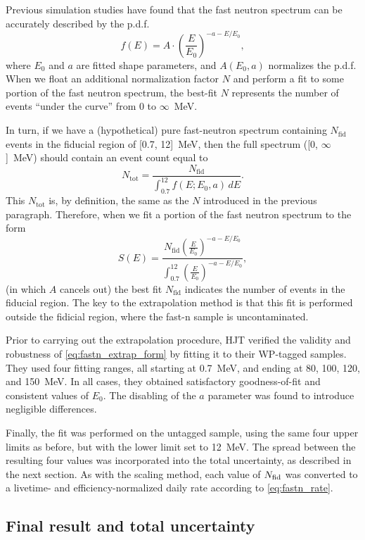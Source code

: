 \documentclass[../thesis.tex]{subfiles}
\begin{document}
Previous simulation studies have found that the fast neutron spectrum can be
accurately described by the p.d.f.
\[ f(E) = A \cdot \left( \frac{E}{E_0} \right)^{-a-E/E_0}, \] where $E_0$ and
$a$ are fitted shape parameters, and $A(E_0, a)$ normalizes the p.d.f. When we
float an additional normalization factor $N$ and perform a fit to some portion
of the fast neutron spectrum, the best-fit $N$ represents the number of events
``under the curve'' from 0 to $\infty$~MeV.

In turn, if we have a (hypothetical) pure fast-neutron spectrum containing
$N_\mathrm{fid}$ events in the fiducial region of [0.7, 12]~MeV, then the full
spectrum ([0, $\infty$]~MeV) should contain an event count equal to
\[ N_\mathrm{tot} = \frac{N_\mathrm{fid}}{\int_{0.7}^{12} f(E; E_0, a)\,dE }. \]
This $N_\mathrm{tot}$ is, by definition, the same as the $N$ introduced in the
previous paragraph. Therefore, when we fit a portion of the fast neutron
spectrum to the form
\begin{equation}
  \label{eq:fastn_extrap_form}
  S(E) = \frac{N_\mathrm{fid} \left( \frac{E}{E_0} \right)^{-a-E/E_0}}
  {\int_{0.7}^{12} \left( \frac{E}{E_0} \right)^{-a-E/E_0} },
\end{equation}
(in which $A$ cancels out) the best fit $N_\mathrm{fid}$ indicates the number of
events in the fiducial region. The key to the extrapolation method is that this
fit is performed outside the fidicial region, where the fast-n sample is
uncontaminated.

Prior to carrying out the extrapolation procedure, HJT verified the validity and
robustness of \eqref{eq:fastn_extrap_form} by fitting it to their WP-tagged
samples. They used four fitting ranges, all starting at 0.7~MeV, and ending at
80, 100, 120, and 150~MeV. In all cases, they obtained satisfactory
goodness-of-fit and consistent values of $E_0$. The disabling of the $a$
parameter was found to introduce negligible differences.

Finally, the fit was performed on the untagged sample, using the same four upper
limits as before, but with the lower limit set to 12~MeV. The spread between the
resulting four values was incorporated into the total uncertainty, as described
in the next section. As with the scaling method, each value of $N_\mathrm{fid}$ was
converted to a livetime- and efficiency-normalized daily rate according to
\eqref{eq:fastn_rate}.

\subsection{Final result and total uncertainty}
\label{sec:fastn_comb}
\end{document}
